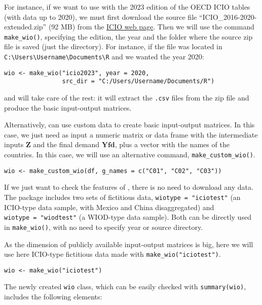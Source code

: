 For instance, if we want to use  with the 2023 edition of the
OECD ICIO tables (with data up to 2020), we must first download the source file
``ICIO\_2016-2020-extended.zip'' (92 MB) from the \href{https://www.oecd.org/sti/ind/inter-country-input-output-tables.htm}{ICIO web
page}. Then
we will use the command \texttt{make\_wio()}, specifying the edition, the year and the
folder where the source zip file is saved (just the directory). For instance, if
the file was located in \texttt{C:\textbackslash{}Users\textbackslash{}Username\textbackslash{}Documents\textbackslash{}R} and we wanted the year
2020:

\begin{verbatim}
wio <- make_wio("icio2023", year = 2020, 
                src_dir = "C:/Users/Username/Documents/R")
\end{verbatim}

and  will take care of the rest: it will extract the
\texttt{.csv} files from the zip file and produce the basic input-output matrices.

Alternatively,  can use custom data to create basic
input-output matrices. In this case, we just need as input a numeric matrix or
data frame with the intermediate inputs \(\mathbf{Z}\) and the final demand
\(\mathbf{Yfd}\), plus a vector with the names of the countries. In this case, we
will use an alternative command, \texttt{make\_custom\_wio()}.

\begin{verbatim}
wio <- make_custom_wio(df, g_names = c("C01", "C02", "C03"))
\end{verbatim}

If we just want to check the features of , there is no need
to download any data. The package includes two sets of fictitious data,
\texttt{wiotype\ =\ "iciotest"} (an ICIO-type data sample, with Mexico and China
disaggregated) and \texttt{wiotype\ =\ "wiodtest"} (a WIOD-type data sample). Both can
be directly used in \texttt{make\_wio()}, with no need to specify year or source
directory.

As the dimension of publicly available input-output matrices is big,
here we will use here ICIO-type fictitious data made with
\texttt{make\_wio("iciotest")}.

\begin{verbatim}
wio <- make_wio("iciotest")
\end{verbatim}

The newly created \texttt{wio} class, which can be easily checked with \texttt{summary(wio)},
includes the following elements:

